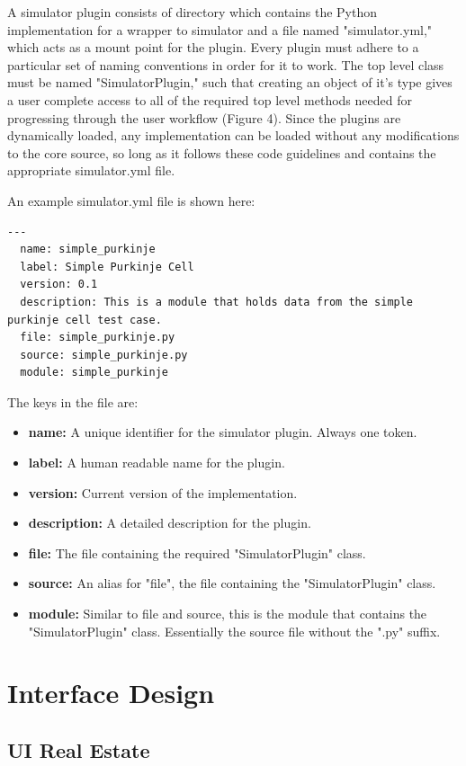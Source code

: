 \documentclass[12pt]{article}
\begin{document}
	A simulator plugin consists of directory which contains the Python implementation for a wrapper to simulator and a file named "simulator.yml," which acts as a mount point for the plugin. Every plugin must adhere to a particular set of naming conventions in order for it to work. The top level class must be named "SimulatorPlugin," such that creating an object of it's type gives a user complete access to all of the required top level methods needed for progressing through the user workflow (Figure 4). Since the plugins are dynamically loaded, any implementation can be loaded without any modifications to the core source, so long as it follows these code guidelines and contains the appropriate simulator.yml file.
	
An example simulator.yml file is shown here:

\begin{verbatim}
---
  name: simple_purkinje
  label: Simple Purkinje Cell
  version: 0.1
  description: This is a module that holds data from the simple purkinje cell test case.
  file: simple_purkinje.py
  source: simple_purkinje.py
  module: simple_purkinje
\end{verbatim}

The keys in the file are:

\begin{itemize}
\item[] {\bf name:} A unique identifier for the simulator plugin. Always one token.
\item[] {\bf label:} A human readable name for the plugin.
\item[] {\bf version:} Current version of the implementation.
\item[] {\bf description:} A detailed description for the plugin. 
\item[] {\bf file:} The file containing the required "SimulatorPlugin" class.
\item[] {\bf source:} An alias for "file", the file containing the "SimulatorPlugin" class.
\item[] {\bf module:} Similar to file and source, this is the module that contains the "SimulatorPlugin" class. Essentially the source file without the ".py" suffix.
\end{itemize}

\section*{Interface Design}

\subsection*{UI Real Estate}
\end{document}
